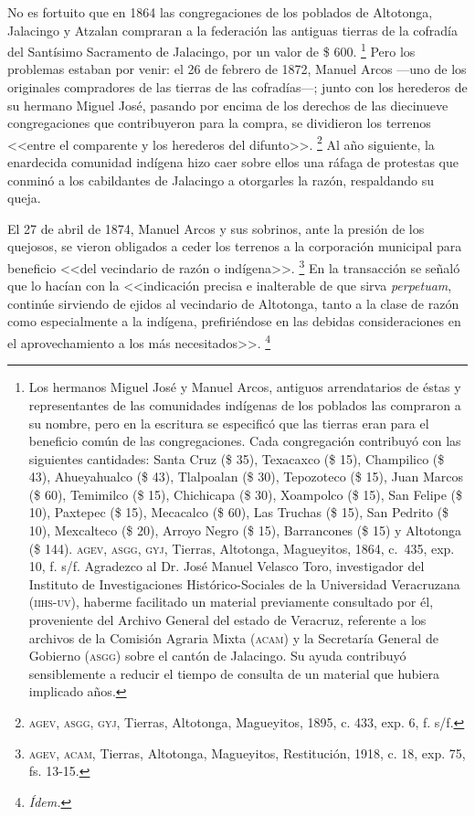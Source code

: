 \documentclass[14pt,twoside,final]{extbook} %
\let\oldfootnote\footnote
\renewcommand\footnote[1]{%
\oldfootnote{\hspace{1mm}#1}}
\begin{document}
No es fortuito que en 1864 las congregaciones de los poblados de Altotonga, Jalacingo y Atzalan compraran a la federación las antiguas tierras de la cofradía del Santísimo Sacramento de Jalacingo, por un valor de \$ 600.\footnote{Los hermanos Miguel José y Manuel Arcos, antiguos arrendatarios de éstas y representantes de las comunidades indígenas de los poblados las compraron a su nombre, pero en la escritura se especificó que las tierras eran para el beneficio común de las congregaciones. Cada congregación contribuyó con las siguientes cantidades: Santa Cruz (\$ 35), Texacaxco (\$ 15), Champilico (\$ 43), Ahueyahualco (\$ 43), Tlalpoalan (\$ 30), Tepozoteco (\$ 15), Juan Marcos (\$ 60), Temimilco (\$ 15), Chichicapa (\$ 30), Xoampolco (\$ 15), San Felipe (\$ 10), Paxtepec (\$ 15), Mecacalco (\$ 60), Las Truchas (\$ 15), San Pedrito (\$ 10), Mexcalteco (\$ 20), Arroyo Negro (\$ 15), Barrancones (\$ 15) y Altotonga (\$ 144). \textsc{agev}, \textsc{asgg}, \textsc{gyj}, Tierras, Altotonga, Magueyitos, 1864, c.~435, exp. 10, f. s/f. Agradezco al Dr. José Manuel Velasco Toro, investigador del Instituto de Investigaciones Histórico-Sociales de la Universidad Veracruzana (\textsc{iihs-uv}), haberme facilitado un material previamente consultado por él, proveniente del Archivo General del estado de Veracruz, referente a los archivos de la Comisión Agraria Mixta (\textsc{acam}) y la Secretaría General de Gobierno (\textsc{asgg}) sobre el cantón de Jalacingo. Su ayuda contribuyó sensiblemente a reducir el tiempo de consulta de un material que hubiera implicado años.} Pero los problemas estaban por venir: el 26 de febrero de 1872, Manuel Arcos ---uno de los originales compradores de las tierras de las cofradías---; junto con los herederos de su hermano Miguel José, pasando por encima de los derechos de las diecinueve congregaciones que contribuyeron para la compra, se dividieron los terrenos <<entre el comparente y los herederos del difunto>>.\footnote{\textsc{agev, asgg, gyj}, Tierras, Altotonga, Magueyitos, 1895, c. 433, exp. 6, f. s/f.} Al año siguiente, la enardecida comunidad indígena hizo caer sobre ellos una ráfaga de protestas que conminó a los cabildantes de Jalacingo a otorgarles la razón, respaldando su queja.

El 27 de abril de 1874, Manuel Arcos y sus sobrinos, ante la presión de los quejosos, se vieron obligados a ceder los terrenos a la corporación municipal para beneficio <<del vecindario de razón o indígena>>.\footnote{\textsc{agev, acam}, Tierras, Altotonga, Magueyitos, Restitución, 1918, c. 18, exp. 75, fs. 13-15.} En la transacción se señaló que lo hacían con la <<indicación precisa e inalterable de que sirva \emph{perpetuam}, continúe sirviendo de ejidos al vecindario de Altotonga, tanto a la clase de razón como especialmente a la indígena, prefiriéndose en las debidas consideraciones en el aprovechamiento a los más necesitados>>.\footnote{\em Ídem.}
\end{document}
